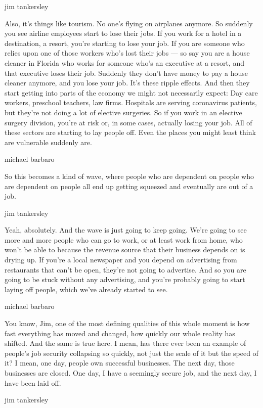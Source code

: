 jim tankersley

Also, it's things like tourism. No one's flying on airplanes anymore. So
suddenly you see airline employees start to lose their jobs. If you work
for a hotel in a destination, a resort, you're starting to lose your
job. If you are someone who relies upon one of those workers who's lost
their jobs --- so say you are a house cleaner in Florida who works for
someone who's an executive at a resort, and that executive loses their
job. Suddenly they don't have money to pay a house cleaner anymore, and
you lose your job. It's these ripple effects. And then they start
getting into parts of the economy we might not necessarily expect: Day
care workers, preschool teachers, law firms. Hospitals are serving
coronavirus patients, but they're not doing a lot of elective surgeries.
So if you work in an elective surgery division, you're at risk or, in
some cases, actually losing your job. All of these sectors are starting
to lay people off. Even the places you might least think are vulnerable
suddenly are.

michael barbaro

So this becomes a kind of wave, where people who are dependent on people
who are dependent on people all end up getting squeezed and eventually
are out of a job.

jim tankersley

Yeah, absolutely. And the wave is just going to keep going. We're going
to see more and more people who can go to work, or at least work from
home, who won't be able to because the revenue source that their
business depends on is drying up. If you're a local newspaper and you
depend on advertising from restaurants that can't be open, they're not
going to advertise. And so you are going to be stuck without any
advertising, and you're probably going to start laying off people, which
we've already started to see.

michael barbaro

You know, Jim, one of the most defining qualities of this whole moment
is how fast everything has moved and changed, how quickly our whole
reality has shifted. And the same is true here. I mean, has there ever
been an example of people's job security collapsing so quickly, not just
the scale of it but the speed of it? I mean, one day, people own
successful businesses. The next day, those businesses are closed. One
day, I have a seemingly secure job, and the next day, I have been laid
off.

jim tankersley

